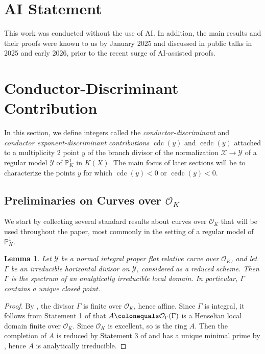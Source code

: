 \documentclass[12pt]{amsart}
\numberwithin{equation}{section}
\newtheorem{lemma}[equation]{Lemma}
\theoremstyle{definition}
\renewcommand{\O}{\mathcal{O}}
\renewcommand{\P}{\mathbb P}
\newcommand{\Spec}{\mathrm{Spec} \ }
\newcommand{\X}{\mathcal{X}}
\newcommand{\Y}{\mathcal{Y}}
\newcommand{\tx}[1]{\text{#1}}
\DeclareMathOperator{\cdc}{cdc}
\DeclareMathOperator{\cedc}{cedc}
\begin{document}
\section*{AI Statement}
This work was conducted without the use of AI. In addition, the main results and their proofs were known to us by January 2025 and discussed in public talks in 2025 and early 2026, prior to the recent surge of AI-assisted proofs.


\section{Conductor-Discriminant Contribution}\label{section 2}
In this section, we define integers called the \textit{conductor-discriminant} and \textit{conductor exponent-discriminant contributions} $\cdc(y)$ and $\cedc(y)$ attached to a multiplicity $2$ point $y$ of the branch divisor of the normalization $\X\to\Y$ of a regular model $\Y$ of $\P^1_K$ in $K(X)$. The main focus of later sections will be to characterize the points $y$ for which $\cdc(y)<0$ or $\cedc(y)<0$.

\subsection{Preliminaries on Curves over $\O_K$}\hfill

We start by collecting several standard results about curves over $\O_K$ that will be used throughout the paper, most commonly in the setting of a regular model of $\P^1_K$.

\begin{lemma}\label{lemma: unique intersection points new}
    Let $\Y$ be a normal integral proper flat relative curve over $\O_K$, and let $\Gamma$ be an irreducible horizontal divisor on $\Y$, considered as a reduced scheme. Then $\Gamma$ is the spectrum of an analytically irreducible local domain. In particular, $\Gamma$ contains a unique closed point.
\end{lemma}
\begin{proof}
    By \cite[Proposition 8.3.4]{Liu_book}, the divisor $\Gamma$ is finite over $\O_K$, hence affine. Since $\Gamma$ is integral, it follows from Statement 1 of \cite[Tag 04GH]{stacks-project} that $A\colonequals\O_{\Gamma}(\Gamma)$ is a Henselian local domain finite over $\O_K$. Since $\O_K$ is excellent, so is the ring $A$. Then the completion of $A$ is reduced by Statement 3 of \cite[Tag 07NZ (3)]{stacks-project} and has a unique minimal prime by \cite[Tag 0C2E]{stacks-project}, hence $A$ is analytically irreducible.
\end{proof}
\end{document}
